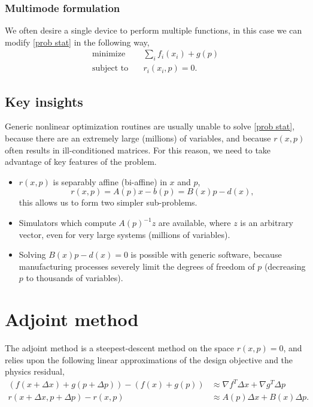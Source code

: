 \documentclass{article}
\begin{document}
\subsubsection{Multimode formulation}
We often desire a single device to perform multiple functions,
    in this case we can modify \eqref{prob stat} in the following way,
    \begin{subequations}\begin{align}
    \text{minimize} \quad   & \sum_i f_i(x_i) + g(p) \\
    \text{subject to} \quad & r_i(x_i, p) = 0.
    \end{align}\label{multi stat}\end{subequations}

\subsection{Key insights}\label{key insights}
Generic nonlinear optimization routines are usually unable
    to solve \eqref{prob stat},
    because there are an extremely large (millions) of variables, 
    and because $r(x,p)$ often results in ill-conditioned matrices.
For this reason, we need to take advantage of key features of the problem.
\begin{itemize}
\item $r(x,p)$ is separably affine (bi-affine) in $x$ and $p$,
    \begin{equation}
    r(x,p) = A(p)x - b(p) = B(x) p - d(x), \label{bi-affine}
    \end{equation}
        this allows us to form two simpler sub-problems.
\item Simulators which compute $A(p)^{-1} z$ are available,
        where $z$ is an arbitrary vector, 
        even for very large systems (millions of variables).
\item Solving $B(x) p - d(x) = 0$ is possible with generic software, 
        because manufacturing processes severely limit
        the degrees of freedom of $p$ 
        (decreasing $p$ to thousands of variables).
\end{itemize}
    


\section{Adjoint method}
The adjoint method is a steepest-descent method
    on the space $r(x,p) = 0$,
    and relies upon the following linear approximations
    of the design objective and the physics residual,
    \begin{subequations}\begin{align}
    (f(x + \Delta x) + g(p + \Delta p)) - (f(x) + g(p)) &\approx
        \nabla f^T \Delta x + \nabla g^T \Delta p \label{d lin} \\ 
    r(x + \Delta x, p + \Delta p) - r(x, p) &\approx
        A(p) \Delta x + B(x) \Delta p. \label{r lin}
    \end{align}\end{subequations}
\end{document}
